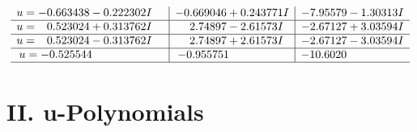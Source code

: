 \documentclass[1p]{elsarticle_modified}
\theoremstyle{definition}
\begin{document}
$$\begin{array}{c|c|c}
\begin{aligned}
u &= -0.663438 - 0.222302 I\end{aligned}
 & -0.669046 + 0.243771 I & -7.95579 - 1.30313 I \\ \hline\begin{aligned}
u &= \phantom{-}0.523024 + 0.313762 I\end{aligned}
 & \phantom{-}2.74897 - 2.61573 I & -2.67127 + 3.03594 I \\ \hline\begin{aligned}
u &= \phantom{-}0.523024 - 0.313762 I\end{aligned}
 & \phantom{-}2.74897 + 2.61573 I & -2.67127 - 3.03594 I \\ \hline\begin{aligned}
u &= -0.525544\phantom{ +0.000000I}\end{aligned}
 & -0.955751\phantom{ +0.000000I} & -10.6020\phantom{ +0.000000I}\\
 \hline 
 \end{array}$$\newpage
\newpage\renewcommand{\arraystretch}{1}
\centering \section*{ II. u-Polynomials}
\end{document}
